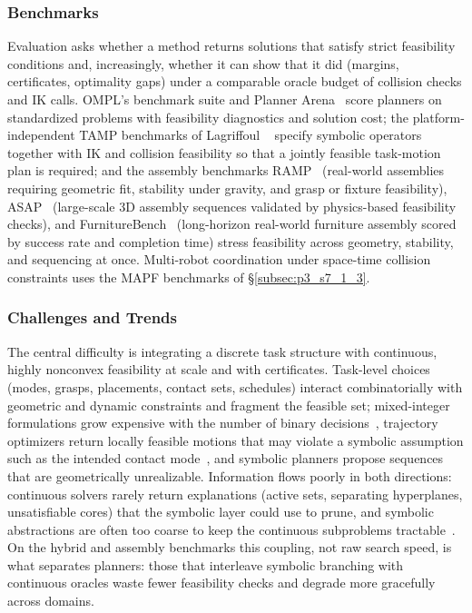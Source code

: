 \subsubsection{Benchmarks}
Evaluation asks whether a method returns solutions that satisfy strict feasibility conditions and, increasingly, whether it can show that it did (margins, certificates, optimality gaps) under a comparable oracle budget of collision checks and IK calls. OMPL's benchmark suite and Planner Arena~\cite{Sucan2012OMPL} score planners on standardized problems with feasibility diagnostics and solution cost; the platform-independent TAMP benchmarks of Lagriffoul \etal~\cite{Lagriffoul2018TAMPBench} specify symbolic operators together with IK and collision feasibility so that a jointly feasible task-motion plan is required; and the assembly benchmarks RAMP~\cite{Collins2023RAMP} (real-world assemblies requiring geometric fit, stability under gravity, and grasp or fixture feasibility), ASAP~\cite{Tian2024ASAP} (large-scale 3D assembly sequences validated by physics-based feasibility checks), and FurnitureBench~\cite{Heo2023FurnitureBench} (long-horizon real-world furniture assembly scored by success rate and completion time) stress feasibility across geometry, stability, and sequencing at once. Multi-robot coordination under space-time collision constraints uses the MAPF benchmarks of §\ref{subsec:p3_s7_1_3}.

\subsubsection{Challenges and Trends}
The central difficulty is integrating a discrete task structure with continuous, highly nonconvex feasibility at scale and with certificates. Task-level choices (modes, grasps, placements, contact sets, schedules) interact combinatorially with geometric and dynamic constraints and fragment the feasible set; mixed-integer formulations grow expensive with the number of binary decisions~\cite{Deits2014IRIS,Marcucci2023SciRobotics}, trajectory optimizers return locally feasible motions that may violate a symbolic assumption such as the intended contact mode~\cite{Zucker2013CHOMP,Schulman2014TrajOpt}, and symbolic planners propose sequences that are geometrically unrealizable. Information flows poorly in both directions: continuous solvers rarely return explanations (active sets, separating hyperplanes, unsatisfiable cores) that the symbolic layer could use to prune, and symbolic abstractions are often too coarse to keep the continuous subproblems tractable~\cite{garrett2020pddlstream,toussaint2015lgp}. On the hybrid and assembly benchmarks this coupling, not raw search speed, is what separates planners: those that interleave symbolic branching with continuous oracles waste fewer feasibility checks and degrade more gracefully across domains.

